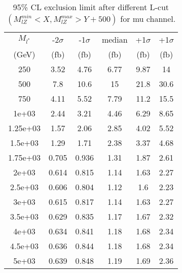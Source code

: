 \documentclass[]{article}
\begin{document}
\begin{table}
\begin{center}
\begin{tabular}{cccccc}
\hline 
\hline 
$M_{l^*}$ & -2$\sigma$ & -1$\sigma$ & median & +1$\sigma$ & +1$\sigma$\\ 
(GeV) & (fb) & (fb) & (fb) & (fb) & (fb)  \\ 
\hline 
\hline 
250 & 3.52 & 4.76 & 6.77 & 9.87 & 14\\
500 & 7.8 & 10.6 & 15 & 21.8 & 30.6\\
750 & 4.11 & 5.52 & 7.79 & 11.2 & 15.5\\
1e+03 & 2.44 & 3.21 & 4.46 & 6.29 & 8.65\\
1.25e+03 & 1.57 & 2.06 & 2.85 & 4.02 & 5.52\\
1.5e+03 & 1.29 & 1.71 & 2.38 & 3.37 & 4.68\\
1.75e+03 & 0.705 & 0.936 & 1.31 & 1.87 & 2.61\\
2e+03 & 0.614 & 0.815 & 1.14 & 1.63 & 2.27\\
2.5e+03 & 0.606 & 0.804 & 1.12 & 1.6 & 2.23\\
3e+03 & 0.615 & 0.817 & 1.14 & 1.63 & 2.27\\
3.5e+03 & 0.629 & 0.835 & 1.17 & 1.67 & 2.32\\
4e+03 & 0.634 & 0.841 & 1.18 & 1.68 & 2.34\\
4.5e+03 & 0.636 & 0.844 & 1.18 & 1.68 & 2.34\\
5e+03 & 0.639 & 0.848 & 1.19 & 1.69 & 2.36\\
\hline 
\end{tabular}
\caption{95\% CL exclusion limit after different L-cut $(M_{lZ}^{min} < X, M_{lZ}^{max} > Y + 500)$ for mu channel.}
\label{tab:limit_muon}
\end{center}
\end{table}
\end{document}
